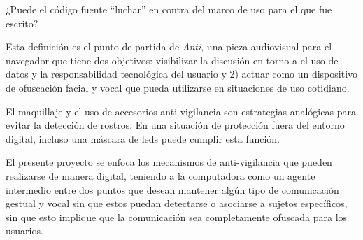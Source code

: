 ¿Puede el código fuente ``luchar'' en contra del marco de uso para el que fue escrito?



Esta definición es el punto de partida de \emph{Anti}, una pieza audiovisual para el navegador que tiene dos objetivos: visibilizar la discusión en torno a el uso de datos y la responsabilidad tecnológica del usuario y 2) actuar como un dispositivo de ofuscación facial y vocal que pueda utilizarse en situaciones de uso cotidiano. 

El maquillaje y el uso de accesorios anti-vigilancia son estrategias analógicas para evitar la detección de rostros. En una situación de protección fuera del entorno digital, incluso una máscara de leds puede cumplir esta función.

El presente proyecto se enfoca los mecanismos de anti-vigilancia que pueden realizarse de manera digital, teniendo a la computadora como un agente intermedio entre dos puntos que desean mantener algún tipo de comunicación gestual y vocal sin que estos puedan detectarse o asociarse a sujetos específicos, sin que esto implique que la comunicación sea completamente ofuscada para los usuarios.



